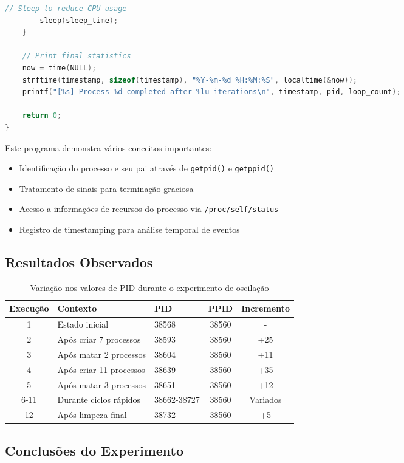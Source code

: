 \documentclass[a4paper,11pt]{article}
\begin{document}
\begin{lstlisting}[language=C, caption=Programa infinite\_loop.c]
        // Sleep to reduce CPU usage
        sleep(sleep_time);
    }

    // Print final statistics
    now = time(NULL);
    strftime(timestamp, sizeof(timestamp), "%Y-%m-%d %H:%M:%S", localtime(&now));
    printf("[%s] Process %d completed after %lu iterations\n", timestamp, pid, loop_count);

    return 0;
}
\end{lstlisting}

Este programa demonstra vários conceitos importantes:
\begin{itemize}
    \item Identificação do processo e seu pai através de \texttt{getpid()} e \texttt{getppid()}
    \item Tratamento de sinais para terminação graciosa
    \item Acesso a informações de recursos do processo via \texttt{/proc/self/status}
    \item Registro de timestamping para análise temporal de eventos
\end{itemize}

\subsection{Resultados Observados}

\begin{table}[h]
\centering
\begin{tabular}{@{}cllcc@{}}
\toprule
\textbf{Execução} & \textbf{Contexto} & \textbf{PID} & \textbf{PPID} & \textbf{Incremento} \\
\midrule
1 & Estado inicial & 38568 & 38560 & - \\
2 & Após criar 7 processos & 38593 & 38560 & +25 \\
3 & Após matar 2 processos & 38604 & 38560 & +11 \\
4 & Após criar 11 processos & 38639 & 38560 & +35 \\
5 & Após matar 3 processos & 38651 & 38560 & +12 \\
6-11 & Durante ciclos rápidos & 38662-38727 & 38560 & Variados \\
12 & Após limpeza final & 38732 & 38560 & +5 \\
\bottomrule
\end{tabular}
\caption{Variação nos valores de PID durante o experimento de oscilação}
\label{tab:pid_oscillation}
\end{table}

\subsection{Conclusões do Experimento}
\end{document}
